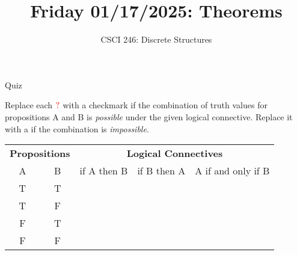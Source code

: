 \documentclass[10pt]{beamer}
\begin{document}






\title{Friday 01/17/2025: Theorems}
\author{CSCI 246: Discrete Structures}
\date{}

\begin{frame}
    \titlepage 
\end{frame}



\begin{frame}{Quiz}

Replace each $\color{red}{?} \color{black}$ with a checkmark \greencheck if the combination of truth values for propositions A and B is \textit{possible} under the given logical connective.  Replace it with a \redx if the combination is \textit{impossible}.

\begin{table}
\centering
\begin{tabular}{cc|ccc}
\multicolumn{2}{c}{\textbf{Propositions}} & \multicolumn{3}{c}{\textbf{Logical Connectives}} \\
A  & B & if A then B & if B then A & A if and only if B \\
\hline 
T & T & \red{?} & \red{?} & \red{?}\\
T & F &\red{?}  & \red{?} & \red{?} \\
F & T & \red{?} & \red{?} & \red{?} \\
F & F & \red{?} &\red{?}  & \red{?}
\end{tabular}
\end{table}
\vfill \vfill \vfill 
\pause 
{}
\end{frame}
\end{document}
